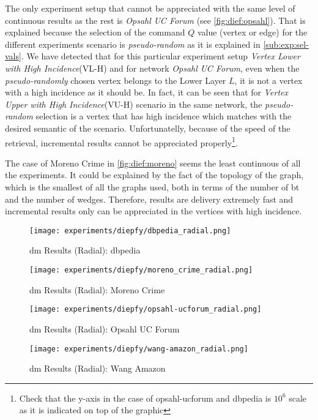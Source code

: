  The only experiment setup that cannot be appreciated with the same level of continuous results as the rest is \emph{Opsahl UC Forum} (see \autoref{fig:dief:opsahl}). 
 That is explained because the selection of the command $Q$ value (vertex or edge) for the different experiments scenario is \emph{pseudo-random} as it is explained in \autoref{sub:exp:sel-vals}. 
 We have detected that for this particular experiment setup \emph{Vertex Lower with High Incidence}(VL-H) and for network \emph{Opsahl UC Forum}, even when the \emph{pseudo-randomly} chosen vertex belongs to the Lower Layer $L$, it is not a vertex with a high incidence as it should be.
 In fact, it can be seen that for \emph{Vertex Upper with High Incidence}(VU-H) scenario in the same network, the \emph{pseudo-random} selection is a vertex that has high incidence which matches with the desired semantic of the scenario. 
 Unfortunatelly, because of the speed of the retrieval, incremental results cannot be appreciated properly\footnote{Check that the y-axis in the case of opsahl-ucforum and \acrshort{dbpedia} is $10^6$ scale as it is indicated on top of the graphic}. 
 
 The case of Moreno Crime in \autoref{fig:dief:moreno} seems the least continuous of all the experiments. 
 It could be explained by the fact of the topology of the graph, which is the smallest of all the graphs used, both in terms of the number of \acrshort{bt} and the number of wedges.
 Therefore, results are delivery extremely fast and incremental results only can be appreciated in the vertices with high incidence.
 
 \begin{figure}[!htb]
   \centering
   \begin{minipage}{0.5\textwidth}
    \texttt{[image: experiments/diepfy/dbpedia\_radial.png]}
     \caption{\acrshort{dm} Results (Radial): \acrshort{dbpedia}}
     \label{fig:dief:dbpedia-radial}
   \end{minipage}%
   \begin{minipage}{0.5\textwidth}
    \texttt{[image: experiments/diepfy/moreno\_crime\_radial.png]}
     \caption{\acrshort{dm} Results (Radial): Moreno Crime}
     \label{fig:dief:moreno-radial}
   \end{minipage}
 \end{figure}
 \begin{figure}[!htb]
   \centering
   \begin{minipage}{0.5\textwidth}
    \texttt{[image: experiments/diepfy/opsahl-ucforum\_radial.png]}
     \caption{\acrshort{dm} Results (Radial): Opsahl UC Forum}
     \label{fig:dief:opsahl-radial}
   \end{minipage}%
   \begin{minipage}{0.5\textwidth}
     \texttt{[image: experiments/diepfy/wang-amazon\_radial.png]}
      \caption{\acrshort{dm} Results (Radial): Wang Amazon}
      \label{fig:dief:wang-radial}
    \end{minipage}
  \end{figure}
 
